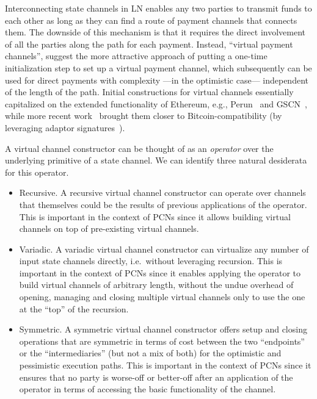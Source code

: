 Interconnecting state channels in LN enables any two parties to transmit funds to each other as long as they can find a route of payment channels that connects them. The downside of this mechanism is that it requires the direct involvement of all the parties along the path for each payment. Instead, ``virtual payment channels'', suggest the more attractive approach of putting a one-time initialization step to set up a virtual payment channel, which subsequently can be used for direct payments with complexity  ---in the optimistic case---  independent of the length of the path.
Initial constructions for virtual channels essentially capitalized on the extended functionality of Ethereum, e.g., 
Perun~\cite{perun} and GSCN~\cite{DBLP:conf/ccs/DziembowskiFH18}, while more
recent work~\cite{cryptoeprint:2020:554}  brought them closer to
Bitcoin-compatibility (by leveraging adaptor
signatures~\cite{cryptoeprint:2020:476}).

A virtual channel constructor can be thought of as an  {\em operator} over the underlying primitive of a state channel. We can identify three   natural desiderata for this operator. 

\begin{itemize}
\item Recursive. A recursive virtual channel constructor can operate over channels that themselves could be the results of previous applications of the operator. This is important in the context of PCNs since it allows building virtual channels on top of pre-existing virtual channels.
\item Variadic. A variadic virtual channel constructor can virtualize any number
of input state channels directly, i.e.\ without leveraging recursion. This is
important in the context of PCNs since it enables applying the operator to build
virtual channels of arbitrary length, without the undue overhead of opening,
managing and closing multiple virtual channels only to use the one at the
``top'' of the recursion.
\item Symmetric. A symmetric virtual channel constructor offers setup and
closing operations that are symmetric in terms of cost between the two
``endpoints'' or the ``intermediaries'' (but not a mix of both) for the optimistic and pessimistic execution paths. This is important in the context of PCNs since it ensures that no party is worse-off or better-off after an application of the operator in terms of accessing the basic functionality of the channel. 
\end{itemize}

